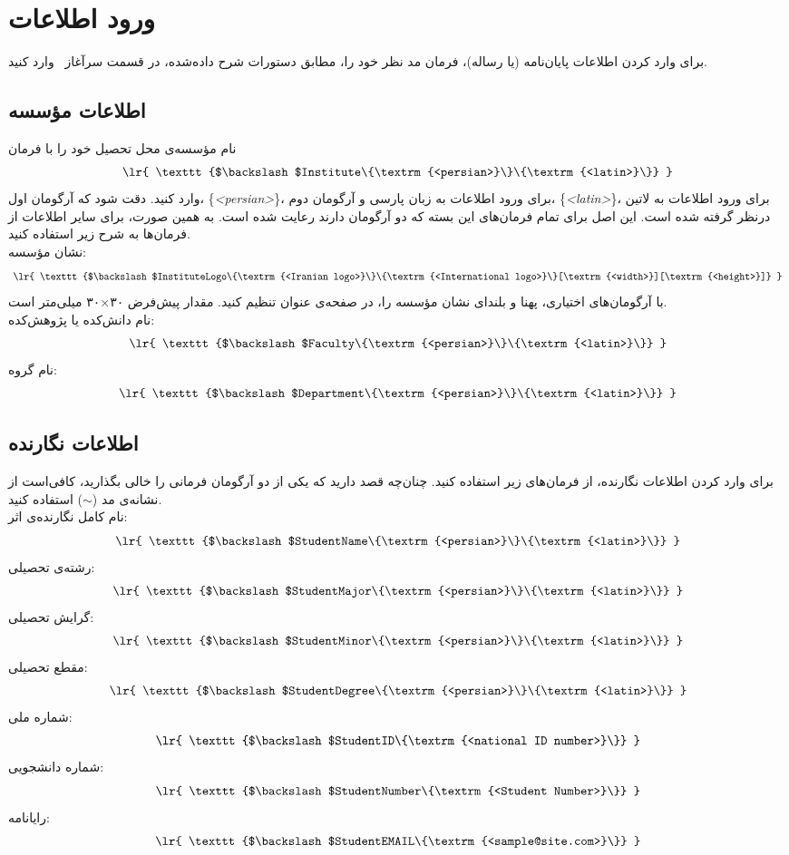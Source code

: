 \documentclass[12pt,a4paper,twoside,fleqn,notitlepage,openany]{extarticle}
\begin{document}
\section{ورود اطلاعات}
برای وارد کردن اطلاعات پایان‌نامه (یا رساله)، فرمان مد نظر خود را، مطابق دستورات شرح داده‌شده، در قسمت سرآغاز ~وارد کنید.
\subsection{اطلاعات مؤسسه}
نام مؤسسه‌ی محل تحصیل خود را با فرمان
\[ \textrm{ \lr{ \texttt{$\backslash$Institute\{\textrm{<persian>}\}\{\textrm{<latin>}\}} } } \]
وارد کنید. دقت شود که آرگومان اول، \{\emph{<persian>}\}، برای ورود اطلاعات به زبان پارسی و آرگومان دوم، \{\emph{<latin>}\}، برای ورود اطلاعات به لاتین درنظر گرفته شده است. این اصل برای تمام فرمان‌های این بسته که دو آرگومان دارند رعایت شده است\@. به همین صورت، برای سایر اطلاعات از فرمان‌ها به شرح زیر استفاده کنید\@. \\
نشان مؤسسه:
\[ \textrm{ \lr{ \texttt{$\backslash$InstituteLogo\{\textrm{<Iranian logo>}\}\{\textrm{<International logo>}\}[\textrm{<width>}][\textrm{<height>}]} } } \]
با آرگومان‌های اختیاری، پهنا و بلندای نشان مؤسسه را، در صفحه‌ی عنوان تنظیم کنید. مقدار پیش‌فرض ۳۰×۳۰ میلی‌متر است\@. \\
نام دانش‌کده یا پژوهش‌کده:
\[ \textrm{ \lr{ \texttt{$\backslash$Faculty\{\textrm{<persian>}\}\{\textrm{<latin>}\}} } } \]
نام گروه:
\[ \textrm{ \lr{ \texttt{$\backslash$Department\{\textrm{<persian>}\}\{\textrm{<latin>}\}} } } \]
\subsection{اطلاعات نگارنده}
برای وارد کردن اطلاعات نگارنده، از فرمان‌های زیر استفاده کنید\@. چنان‌چه قصد دارید که یکی از دو آرگومان فرمانی را خالی بگذارید، کافی‌است از نشانه‌ی مد ($\sim$) استفاده کنید\@. \\
نام کامل نگارنده‌ی اثر:
\[ \textrm{ \lr{ \texttt{$\backslash$StudentName\{\textrm{<persian>}\}\{\textrm{<latin>}\}} } } \]
رشته‌ی تحصیلی:
\[ \textrm{ \lr{ \texttt{$\backslash$StudentMajor\{\textrm{<persian>}\}\{\textrm{<latin>}\}} } } \]
گرایش تحصیلی:
\[ \textrm{ \lr{ \texttt{$\backslash$StudentMinor\{\textrm{<persian>}\}\{\textrm{<latin>}\}} } } \]
مقطع تحصیلی:
\[ \textrm{ \lr{ \texttt{$\backslash$StudentDegree\{\textrm{<persian>}\}\{\textrm{<latin>}\}} } } \]
شماره ملی:
\[ \textrm{ \lr{ \texttt{$\backslash$StudentID\{\textrm{<national ID number>}\}} } } \]
شماره دانشجویی:
\[ \textrm{ \lr{ \texttt{$\backslash$StudentNumber\{\textrm{<Student Number>}\}} } } \]
رایانامه:
\[ \textrm{ \lr{ \texttt{$\backslash$StudentEMAIL\{\textrm{<sample@site.com>}\}} } } \]
\end{document}
